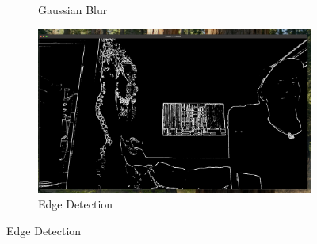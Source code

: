 \documentclass[12pt,a4paper]{article}
\begin{document}
\begin{figure}[H]
\begin{subfigure}[b]{0.32\textwidth}
        \caption{Gaussian Blur}
        \label{fig:filter_blur}
    \end{subfigure}
    \hfill
    \begin{subfigure}[b]{0.32\textwidth}
        \centering
        \includegraphics[width=\textwidth]{filters/edge.png}
        \caption{Edge Detection}
        \label{fig:filter_edge}
    \end{subfigure}
    
    \vspace{0.5cm}
    

\end{figure}
\end{document}
